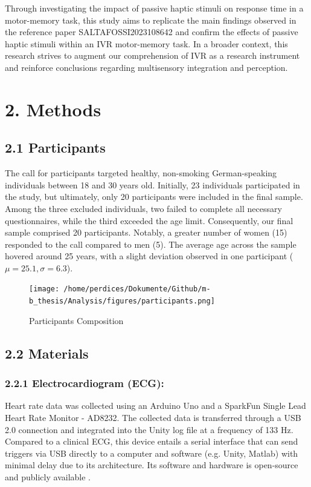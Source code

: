 \documentclass[12pt,oneside,openright]{report}
\begin{document}
Through investigating the impact of passive haptic stimuli on response time in a motor-memory task, this study aims to replicate the main findings observed in the reference paper {SALTAFOSSI2023108642} and confirm the effects of passive haptic stimuli within an IVR motor-memory task. In a broader context, this research strives to augment our comprehension of IVR as a research instrument and reinforce conclusions regarding multisensory integration and perception.

\section*{2. Methods}
\subsection*{2.1 Participants}
The call for participants targeted healthy, non-smoking German-speaking individuals between 18 and 30 years old. Initially, 23 individuals participated in the study, but ultimately, only 20 participants were included in the final sample. Among the three excluded individuals, two failed to complete all necessary questionnaires, while the third exceeded the age limit. Consequently, our final sample comprised 20 participants. Notably, a greater number of women (15) responded to the call compared to men (5). The average age across the sample hovered around 25 years, with a slight deviation observed in one participant ($\mu=25.1, \sigma=6.3$).

\begin{figure}[h]
    \centering
    \texttt{[image: /home/perdices/Dokumente/Github/m-b\_thesis/Analysis/figures/participants.png]}
    \caption{Participants Composition}
    \label{fig:mesh1}
\end{figure}

    
\subsection*{2.2 Materials}
\subsubsection*{2.2.1 Electrocardiogram (ECG):}
Heart rate data was collected using an Arduino Uno and a SparkFun Single Lead Heart Rate Monitor - AD8232. The collected data is transferred through a USB 2.0 connection and integrated into the Unity log file at a frequency of 133 Hz. Compared to a clinical ECG, this device entails a serial interface that can send triggers via USB directly to a computer and software (e.g. Unity, Matlab) with minimal delay due to its architecture. Its software and hardware is open-source and publicly available \parencite{TimsECG}.
\end{document}
